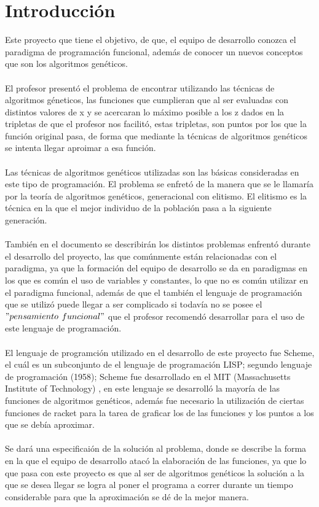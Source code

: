 \documentclass[10pt,a4paper]{article}
\begin{document}
\section{Introducción}
\bigskip
\bigskip 
\bigskip 
\bigskip 
	Este proyecto que tiene el objetivo, de que, el equipo de desarrollo conozca el paradigma de programación funcional, además de conocer un nuevos conceptos que son los algoritmos genéticos.\\\\
	El profesor presentó el problema de encontrar utilizando las técnicas de algoritmos géneticos, las funciones que cumplieran que al ser evaluadas con distintos valores de x y se acercaran lo máximo posible a los z dados en la tripletas de que el profesor nos facilitó, estas tripletas, son puntos por los que la función original pasa, de forma que mediante la técnicas de algoritmos genéticos se intenta llegar aproimar a esa función.\\\\
	Las técnicas de algoritmos genéticos utilizadas son las básicas consideradas en este tipo de programación. El problema se enfretó de la manera que se le llamaría por la teoría de algoritmos genéticos, generacional con elitismo. El elitismo es la técnica en la que el mejor individuo de la población pasa a la siguiente generación.\\\\
	También en el documento se describirán los distintos problemas enfrentó durante el desarrollo del proyecto, las que comúnmente  están relacionadas con el paradigma, ya que la formación del equipo de desarrollo se da en paradigmas en los que es común el uso de variables y constantes, lo que no es común utilizar en el paradigma funcional, además de que el también el lenguaje de programación que se utilizó puede llegar a ser complicado si todavía no se posee el $"pensamiento$  $funcional"$ que el profesor recomendó desarrollar para el uso de este lenguaje de programación.\\\\
	El lenguaje de programción utilizado en el desarrollo de este proyecto fue Scheme, el cuál es un subconjunto de el lenguaje de programación LISP; segundo lenguaje de programación (1958); Scheme fue desarrollado en el MIT (Massachusetts Institute of Technology) , en este lenguaje se desarrolló la mayoría de las funciones de algoritmos genéticos, además fue necesario la utilización de ciertas funciones de racket para la tarea de graficar los de las funciones y los puntos a los que se debía aproximar.\\\\
	Se dará una especificaión de la solución al problema, donde se describe la forma en la que el equipo de desarrollo atacó la elaboración de las funciones, ya que lo que pasa con este proyecto es que al ser de algoritmos genéticos la solución a la que se desea llegar se logra al poner el programa a correr durante un tiempo considerable para que la aproximación se dé de la mejor manera.\\ 
\pagebreak
\end{document}
